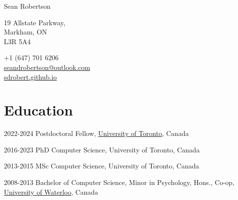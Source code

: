 \documentclass{article}
\begin{document}
\thispagestyle{empty}

\begin{center}
  \huge{Sean Robertson}
\end{center}
\vspace{\baselineskip}

\begin{center}
  \begin{minipage}{0.5\textwidth}
  \begin{flushleft}
    19 Allstate Parkway, \\
    Markham, ON \\
    L3R 5A4
  \end{flushleft}
  \end{minipage}
  \hfill
  \begin{minipage}{0.4\textwidth}
  \begin{flushright}
    +1 (647) 701 6206 \\
    \href{mailto:seandrobertson@outlook.com}{seandrobertson@outlook.com} \\
    \href{https://sdrobert.github.io}{sdrobert.github.io}
  \end{flushright}
  \end{minipage}
\end{center}

\section{Education}
\begin{CV}
  \item[2022-2024] Postdoctoral Fellow,
    \href{https://www.utoronto.ca/}{University of Toronto}, Canada

  \item[2016-2023] PhD Computer Science, University of Toronto, Canada
    
  \item[2013-2015] MSc Computer Science, University of Toronto, Canada

  \item[2008-2013] Bachelor of Computer Science, Minor in Psychology, Hons.,
    Co-op, \href{https://uwaterloo.ca/}{University of Waterloo}, Canada
\end{CV}
\end{document}
